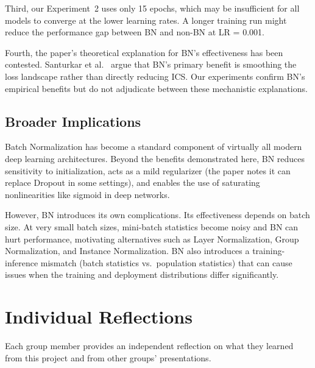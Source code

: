 \documentclass{article}
\begin{document}
Third, our Experiment~2 uses only 15 epochs, which may be insufficient for all models to
converge at the lower learning rates. A longer training run might reduce the performance gap
between BN and non-BN at LR = 0.001.

Fourth, the paper's theoretical explanation for BN's effectiveness has been contested.
Santurkar et al.~\cite{santurkar2018does} argue that BN's primary benefit is smoothing the
loss landscape rather than directly reducing ICS. Our experiments confirm BN's empirical
benefits but do not adjudicate between these mechanistic explanations.

\subsection{Broader Implications}

Batch Normalization has become a standard component of virtually all modern deep learning
architectures. Beyond the benefits demonstrated here, BN reduces sensitivity to initialization,
acts as a mild regularizer (the paper notes it can replace Dropout in some settings), and
enables the use of saturating nonlinearities like sigmoid in deep networks.

However, BN introduces its own complications. Its effectiveness depends on batch size. At very
small batch sizes, mini-batch statistics become noisy and BN can hurt performance, motivating
alternatives such as Layer Normalization, Group Normalization, and Instance Normalization. BN
also introduces a training-inference mismatch (batch statistics vs.\ population statistics)
that can cause issues when the training and deployment distributions differ significantly.


\section{Individual Reflections}

Each group member provides an independent reflection on what they learned from this project
and from other groups' presentations.
\end{document}
